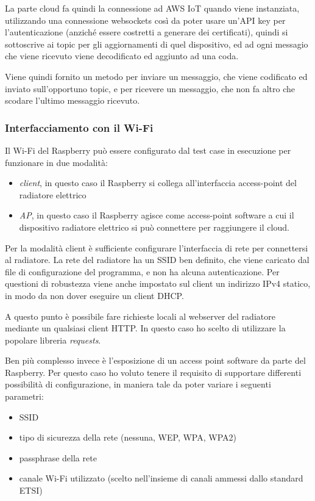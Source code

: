 \documentclass[a4paper,titlepage]{article}
\begin{document}
La parte cloud fa quindi la connessione ad AWS IoT quando viene instanziata, utilizzando
una connessione websockets così da poter usare un'API key per l'autenticazione (anziché
essere costretti a generare dei certificati), quindi si sottoscrive ai topic per gli
aggiornamenti di quel dispositivo, ed ad ogni messagio che viene ricevuto viene decodificato
ed aggiunto ad una coda.

Viene quindi fornito un metodo per inviare un messaggio, che viene codificato ed
inviato sull'opportuno topic, e per ricevere un messaggio, che non fa altro che scodare
l'ultimo messaggio ricevuto.


\subsubsection{Interfacciamento con il Wi-Fi}

Il Wi-Fi del Raspberry può essere configurato dal test case in esecuzione per
funzionare in due modalità:

\begin{itemize}
    \item \textit{client}, in questo caso il Raspberry si collega all'interfaccia
        access-point del radiatore elettrico
    \item \textit{AP}, in questo caso il Raspberry agisce come access-point software
        a cui il dispositivo radiatore elettrico si può connettere per raggiungere il
        cloud.
\end{itemize}

Per la modalità client è sufficiente configurare l'interfaccia di rete per connettersi
al radiatore. La rete del radiatore ha un SSID ben definito, che viene caricato dal
file di configurazione del programma, e non ha alcuna autenticazione. Per questioni
di robustezza viene anche impostato sul client un indirizzo IPv4 statico, in modo da
non dover eseguire un client DHCP.

A questo punto è possibile fare richieste locali al webserver del radiatore mediante
un qualsiasi client HTTP. In questo caso ho scelto di utilizzare la popolare
libreria \textit{requests}.

Ben più complesso invece è l'esposizione di un access point software da parte del
Raspberry. Per questo caso ho voluto tenere il requisito di supportare differenti
possibilità di configurazione, in maniera tale da poter variare i seguenti parametri:
\begin{itemize}
    \item SSID
    \item tipo di sicurezza della rete (nessuna, WEP, WPA, WPA2)
    \item passphrase della rete
    \item canale Wi-Fi utilizzato (scelto nell'insieme di canali ammessi dallo standard ETSI)
\end{itemize}
\end{document}
